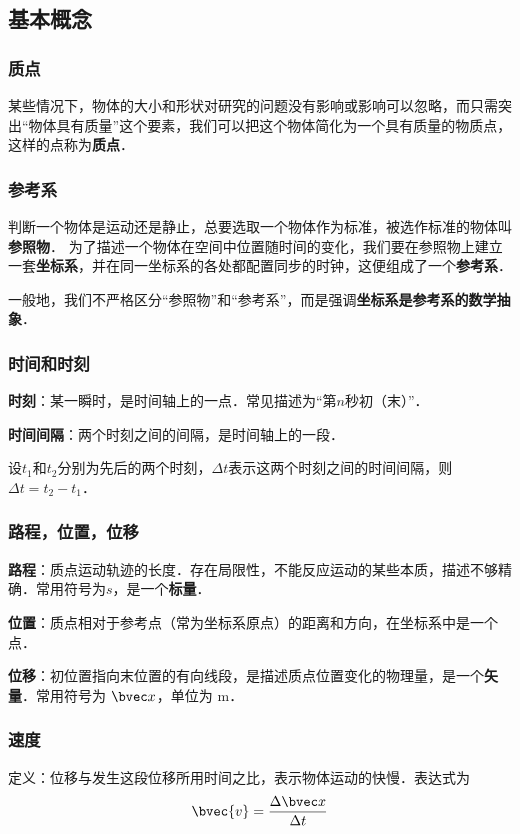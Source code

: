 

\subsection{基本概念}
\subsubsection{质点}
某些情况下，物体的大小和形状对研究的问题没有影响或影响可以忽略，而只需突出“物体具有质量”这个要素，我们可以把这个物体简化为一个具有质量的物质点，这样的点称为\textbf{质点}．

\subsubsection{参考系}
判断一个物体是运动还是静止，总要选取一个物体作为标准，被选作标准的物体叫\textbf{参照物}．
为了描述一个物体在空间中位置随时间的变化，我们要在参照物上建立一套\textbf{坐标系}，并在同一坐标系的各处都配置同步的时钟，这便组成了一个\textbf{参考系}．

一般地，我们不严格区分“参照物”和“参考系”，而是强调\textbf{坐标系是参考系的数学抽象}．

\subsubsection{时间和时刻}
\textbf{时刻}：某一瞬时，是时间轴上的一点．常见描述为“第$n$秒初（末）”．

\textbf{时间间隔}：两个时刻之间的间隔，是时间轴上的一段．

设$t_1$和$t_2$分别为先后的两个时刻，$\Delta t$表示这两个时刻之间的时间间隔，则$\Delta t = t_2 - t_1$．

\subsubsection{路程，位置，位移}
\textbf{路程}：质点运动轨迹的长度．存在局限性，不能反应运动的某些本质，描述不够精确．常用符号为$s$，是一个\textbf{标量}．

\textbf{位置}：质点相对于参考点（常为坐标系原点）的距离和方向，在坐标系中是一个点．

\textbf{位移}：初位置指向末位置的有向线段，是描述质点位置变化的物理量，是一个\textbf{矢量}．常用符号为 $\bvec x$，单位为 $\mathrm{m}$．

\subsubsection{速度}
定义：位移与发生这段位移所用时间之比，表示物体运动的快慢．表达式为
\begin{equation}\label{HSPM01_eq3}
\bvec{v} = \frac{\Delta \bvec x}{\Delta t}
\end{equation}


